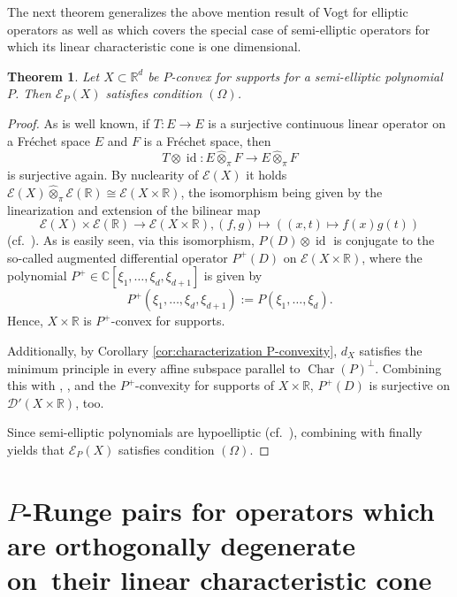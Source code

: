 \documentclass[a4paper,10pt]{amsart}
\newtheorem{theorem}{Theorem}
\newtheorem*{crucial lemma}{Lemma \ref{lem:nice polynomial2}}
\theoremstyle{definition}
\newcommand{\R}{\mathbb{R}}
\newcommand{\C}{\mathbb{C}}
\newcommand{\charcone}{\operatorname{Char}}
\newcommand{\veryniceon}[1]{orthogonally degenerate on~#1}
\begin{document}
The next theorem generalizes the above mention result of Vogt for elliptic operators as well as \cite[Theorem 18]{Kalmes19} which covers the special case of semi-elliptic operators for which its linear characteristic cone is one dimensional.

\begin{theorem}\label{theorem:Omega for semi-elliptic}
    Let $X\subset\R^d$ be $P$-convex for supports for a semi-elliptic polynomial $P$. Then $\mathscr{E}_P(X)$ satisfies condition $(\Omega)$.
\end{theorem}

\begin{proof}
    As is well known, if $T:E\rightarrow E$ is a surjective continuous linear operator on a Fr\'echet space $E$ and $F$ is a Fr\'echet space, then
    \[T\otimes \operatorname{id}\colon E\hat{\otimes}_\pi F \rightarrow E\hat{\otimes}_\pi F\]
    is surjective again. By nuclearity of $\mathscr{E}(X)$ it holds $\mathscr{E}(X)\hat{\otimes}_\pi\mathscr{E}(\R)\cong\mathscr{E}(X\times \R)$, the isomorphism being given by the linearization and extension of the bilinear map
    \[\mathscr{E}(X)\times\mathscr{E}(\R)\rightarrow\mathscr{E}(X\times\R),(f,g)\mapsto\left((x,t)\mapsto f(x)g(t)\right)\]
    (cf.~\cite[Section 21.6]{Jarchow1981}). As is easily seen, via this isomorphism, $P(D)\otimes\operatorname{id}$ is conjugate to the so-called augmented differential operator $P^+(D)$ on $\mathscr{E}(X\times\R)$, where the polynomial $P^+\in\C[\xi_1,\ldots,\xi_d,\xi_{d+1}]$ is given by
    \[P^+(\xi_1,\ldots,\xi_d,\xi_{d+1}):=P(\xi_1,\ldots,\xi_d).\]
    Hence, $X\times\R$ is $P^+$-convex for supports.

    Additionally, by Corollary \ref{cor:characterization P-convexity}, $d_X$ satisfies the minimum principle in every affine subspace parallel to $\charcone(P)^\perp$. Combining this with \cite[Corollary 10.7.10]{Hor2}, \cite[Theorem 15]{Kalmes19}, and the $P^+$-convexity for supports of $X\times\R$, $P^+(D)$ is surjective on $\mathscr{D}'(X\times\R)$, too.

    Since semi-elliptic polynomials are hypoelliptic (cf.~\cite[Theorem 11.1.11]{Hor2}), combining \cite[Theorem 52.1]{Treves1967b} with \cite[Propositions 8.3 and 5.3 (b)]{BonetDomanski06} finally yields that $\mathscr{E}_P(X)$ satisfies condition $(\Omega)$.
\end{proof}


\section{\texorpdfstring{$P$}{P}-Runge pairs for operators which are \veryniceon{their linear characteristic cone}}\label{sec:p-Runge pairs}
\end{document}
